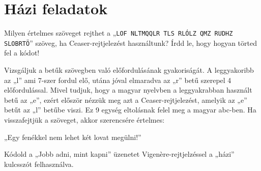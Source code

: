 \section*{Házi feladatok}
\begin{problem}
Milyen értelmes szöveget rejthet a „\texttt{LOF NLTMQQLR TLS RLÓLZ
QMZ RUDHZ SLOBRTÖ}” szöveg, ha Ceaser-rejtjelezést használtunk? Írdd
le, hogy hogyan törted fel a kódot! 
\end{problem}

\begin{solution}
Vizsgáljuk a betűk szövegben való előfordulásának gyakoriságát. A
leggyakoribb az „l” ami 7-szer fordul elő, utána jóval elmaradva az
„r” betű szerepel 4 előfordulással. Mivel tudjuk, hogy a magyar nyelvben
a leggyakrabban használt betű az „e”, ezért először nézzük meg azt
a Ceaser-rejtjelezést, amelyik az „e” betűt az „l” betűbe viszi. Ez
9 egység eltolásnak felel meg a magyar abc-ben. Ha visszafejtjük a
szöveget, akkor szerencsére értelmes:

„Egy fenékkel nem lehet két lovat megülni!” 
\end{solution}
\begin{problem}
Kódold a „Jobb adni, mint kapni” üzenetet Vigenère-rejtjelzéssel
a „házi” kulcsszót felhasználva. 
\end{problem}

